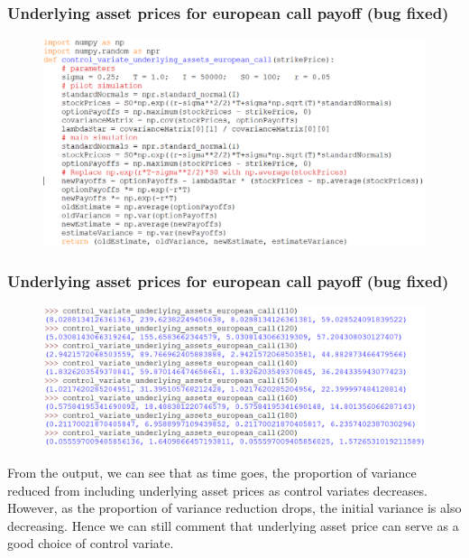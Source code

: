 \documentclass{beamer}
\begin{document}
\begin{frame}
\frametitle{Underlying asset prices for european call payoff (bug fixed)}
\begin{figure}[H]
	\includegraphics[scale=0.38]{control_variate_european_call_underlying_asset_prices.png}
\end{figure}
\end{frame}

\begin{frame}
\frametitle{Underlying asset prices for european call payoff (bug fixed)}
\begin{figure}[H]
	\includegraphics[scale=0.38]{control_variate_european_call_underlying_asset_prices_test.png}
\end{figure}
From the output, we can see that as time goes, the proportion of variance reduced from including underlying asset prices as control variates decreases. However, as the proportion of variance reduction drops, the initial variance is also decreasing. Hence we can still comment that underlying asset price can serve as a good choice of control variate.
\end{frame}
\end{document}
